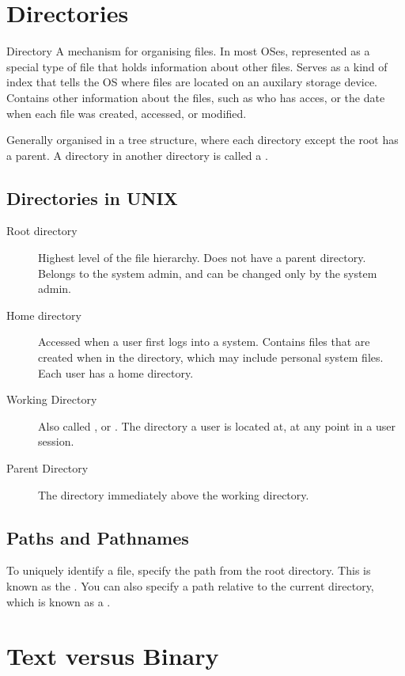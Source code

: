 \documentclass[\main/notes.tex]{subfiles}
\begin{document}
		\section{Directories}
			\begin{definition}{Directory}
				A mechanism for organising files. In most OSes, represented as a special type of file that holds information about other files. Serves as a kind of index that tells the OS where files are located on an auxilary storage device. Contains other information about the files, such as who has acces, or the date when each file was created, accessed, or modified.

				Generally organised in a tree structure, where each directory except the root has a parent. A directory in another directory is called a .
			\end{definition}
			\subsection{Directories in UNIX}
				\begin{description}
					\item[Root directory] Highest level of the file hierarchy. Does not have a parent directory. Belongs to the system admin, and can be changed only by the system admin.
					\item[Home directory] Accessed when a user first logs into a system. Contains files that are created when in the directory, which may include personal system files. Each user has a home directory.
					\item[Working Directory] Also called , or . The directory a user is located at, at any point in a user session.
					\item[Parent Directory] The directory immediately above the working directory.
				\end{description}
			\subsection{Paths and Pathnames}
				To uniquely identify a file, specify the path from the root directory. This is known as the . You can also specify a path relative to the current directory, which is known as a .

		\section{Text versus Binary}
\end{document}
